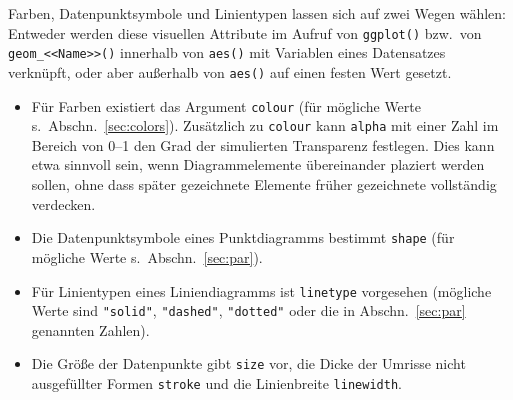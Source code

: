 Farben, Datenpunktsymbole und Linientypen lassen sich auf zwei Wegen wählen: Entweder werden diese visuellen Attribute im Aufruf von \lstinline!ggplot()! bzw.\ von \lstinline!geom_<<Name>>()! innerhalb von \lstinline!aes()! mit Variablen eines Datensatzes verknüpft, oder aber außerhalb von \lstinline!aes()! auf einen festen Wert gesetzt.
\begin{itemize}
\item Für Farben existiert das Argument \lstinline!colour! (für mögliche Werte s.\ Abschn.\ \ref{sec:colors}). Zusätzlich zu \lstinline!colour! kann \lstinline!alpha! mit einer Zahl im Bereich von 0--1 den Grad der simulierten Transparenz festlegen. Dies kann etwa sinnvoll sein, wenn Diagrammelemente übereinander plaziert werden sollen, ohne dass später gezeichnete Elemente früher gezeichnete vollständig verdecken.
\item Die Datenpunktsymbole eines Punktdiagramms bestimmt \lstinline!shape! (für mögliche Werte s.\ Abschn.\ \ref{sec:par}).
\item Für Linientypen eines Liniendiagramms ist \lstinline!linetype! vorgesehen (mögliche Werte sind \lstinline!"solid"!, \lstinline!"dashed"!, \lstinline!"dotted"! oder die in Abschn.\ \ref{sec:par} genannten Zahlen).
\item Die Größe der Datenpunkte gibt \lstinline!size! vor, die Dicke der Umrisse nicht ausgefüllter Formen \lstinline!stroke! und die Linienbreite \lstinline!linewidth!. 
\end{itemize}

